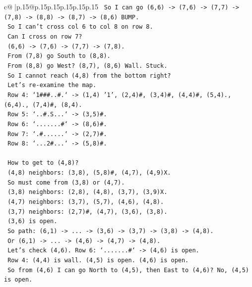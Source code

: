 \documentclass{article}
\begin{document}
{\begin{supertabular}{c@{$\;$}|p{.15\linewidth}@{}p{.15\linewidth}p{.15\linewidth}p{.15\linewidth}p{.15\linewidth}p{.15\linewidth}}
{{{\texttt{      So I can go (6,6) {-}> (7,6) {-}> (7,7) {-}> (7,8) {-}> (8,8) {-}> (8,7) {-}> (8,6) BUMP.} \\
\texttt{      So I can't cross col 6 to col 8 on row 8.} \\
\texttt{      Can I cross on row 7?} \\
\texttt{      (6,6) {-}> (7,6) {-}> (7,7) {-}> (7,8).} \\
\texttt{      From (7,8) go South to (8,8).} \\
\texttt{      From (8,8) go West? (8,7), (8,6) Wall. Stuck.} \\
\texttt{      So I cannot reach (4,8) from the bottom right?} \\
\texttt{      Let's re{-}examine the map.} \\
\texttt{      Row 4: `1\#\#\#..\#.` {-}> (1,4) '1', (2,4)\#, (3,4)\#, (4,4)\#, (5,4)., (6,4)., (7,4)\#, (8,4).} \\
\texttt{      Row 5: `..\#.S...` {-}> (3,5)\#.} \\
\texttt{      Row 6: `.......\#` {-}> (8,6)\#.} \\
\texttt{      Row 7: `.\#......` {-}> (2,7)\#.} \\
\texttt{      Row 8: `...2\#...` {-}> (5,8)\#.} \\
\\ 
\texttt{      How to get to (4,8)?} \\
\texttt{      (4,8) neighbors: (3,8), (5,8)\#, (4,7), (4,9)X.} \\
\texttt{      So must come from (3,8) or (4,7).} \\
\texttt{      (3,8) neighbors: (2,8), (4,8), (3,7), (3,9)X.} \\
\texttt{      (4,7) neighbors: (3,7), (5,7), (4,6), (4,8).} \\
\texttt{      (3,7) neighbors: (2,7)\#, (4,7), (3,6), (3,8).} \\
\texttt{      (3,6) is open.} \\
\texttt{      So path: (6,1) {-}> ... {-}> (3,6) {-}> (3,7) {-}> (3,8) {-}> (4,8).} \\
\texttt{      Or (6,1) {-}> ... {-}> (4,6) {-}> (4,7) {-}> (4,8).} \\
\texttt{      Let's check (4,6). Row 6: `.......\#` {-}> (4,6) is open.} \\
\texttt{      Row 4: (4,4) is wall. (4,5) is open. (4,6) is open.} \\
\texttt{      So from (4,6) I can go North to (4,5), then East to (4,6)? No, (4,5) is open.} \\
}}}
\end{supertabular}}
\end{document}
